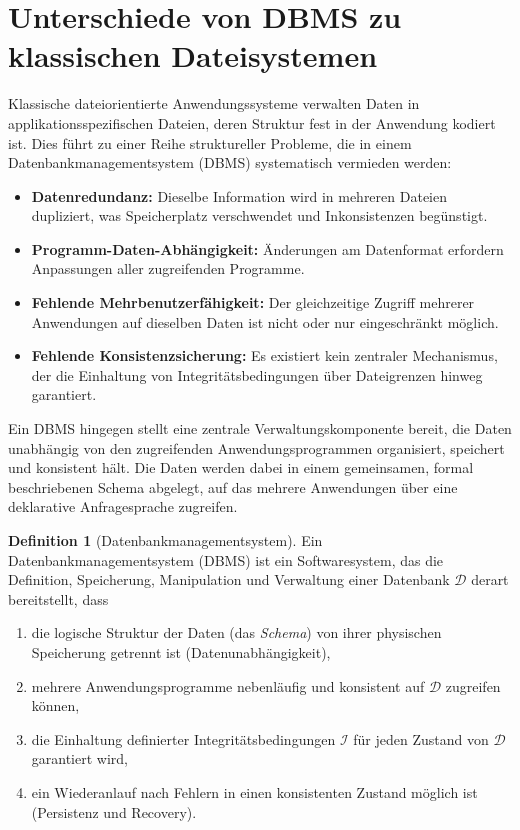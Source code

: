 ﻿\documentclass[a4paper,12pt]{report}
\theoremstyle{definition}
\newtheorem{definition}{Definition}[chapter]
\theoremstyle{remark}
\begin{document}
\section{Unterschiede von DBMS zu klassischen Dateisystemen}

Klassische dateiorientierte Anwendungssysteme verwalten Daten in
applikationsspezifischen Dateien, deren Struktur fest in der Anwendung
kodiert ist. Dies führt zu einer Reihe struktureller Probleme, die in
einem Datenbankmanagementsystem (DBMS) systematisch vermieden werden:

\begin{itemize}
  \item \textbf{Datenredundanz:} Dieselbe Information wird in mehreren
    Dateien dupliziert, was Speicherplatz verschwendet und
    Inkonsistenzen begünstigt.
  \item \textbf{Programm-Daten-Abhängigkeit:} Änderungen am
    Datenformat erfordern Anpassungen aller zugreifenden Programme.
  \item \textbf{Fehlende Mehrbenutzerfähigkeit:} Der gleichzeitige
    Zugriff mehrerer Anwendungen auf dieselben Daten ist nicht oder nur
    eingeschränkt möglich.
  \item \textbf{Fehlende Konsistenzsicherung:} Es existiert kein
    zentraler Mechanismus, der die Einhaltung von
    Integritätsbedingungen über Dateigrenzen hinweg garantiert.
\end{itemize}

Ein DBMS hingegen stellt eine zentrale Verwaltungskomponente bereit, die
Daten unabhängig von den zugreifenden Anwendungsprogrammen organisiert,
speichert und konsistent hält. Die Daten werden dabei in einem
gemeinsamen, formal beschriebenen Schema abgelegt, auf das mehrere
Anwendungen über eine deklarative Anfragesprache zugreifen.

\begin{definition}[Datenbankmanagementsystem]
\label{def:dbms}
Ein Datenbankmanagementsystem (DBMS) ist ein Softwaresystem, das die
Definition, Speicherung, Manipulation und Verwaltung einer Datenbank
$\mathcal{D}$ derart bereitstellt, dass
\begin{enumerate}
  \item die logische Struktur der Daten (das \emph{Schema}) von ihrer
    physischen Speicherung getrennt ist (Datenunabhängigkeit),
  \item mehrere Anwendungsprogramme nebenläufig und konsistent auf
    $\mathcal{D}$ zugreifen können,
  \item die Einhaltung definierter Integritätsbedingungen
    $\mathcal{I}$ für jeden Zustand von $\mathcal{D}$ garantiert wird,
  \item ein Wiederanlauf nach Fehlern in einen konsistenten Zustand
    möglich ist (Persistenz und Recovery).
\end{enumerate}
\end{definition}
\end{document}

